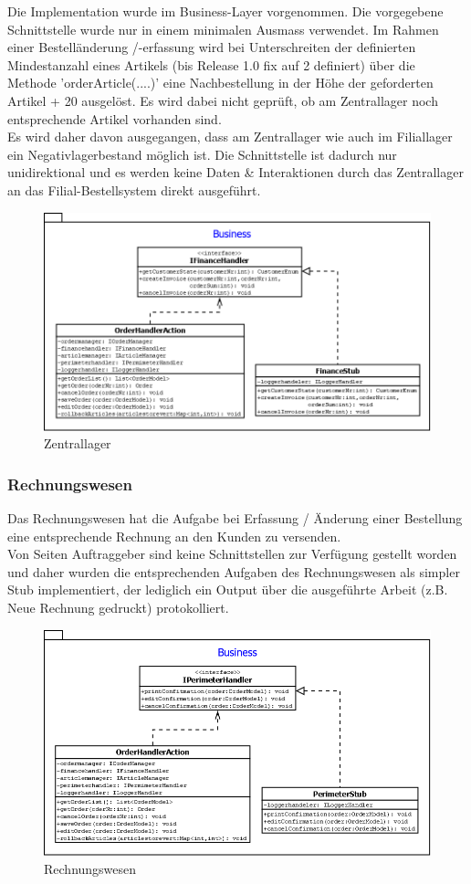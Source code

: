 Die Implementation wurde im Business-Layer vorgenommen. Die vorgegebene Schnittstelle wurde nur in einem minimalen Ausmass verwendet. Im Rahmen einer Bestelländerung /-erfassung wird bei Unterschreiten der definierten Mindestanzahl eines Artikels (bis Release 1.0 fix auf 2 definiert) über die Methode 'orderArticle(....)' eine Nachbestellung in der Höhe der geforderten Artikel + 20 ausgelöst. Es wird dabei nicht geprüft, ob am Zentrallager noch entsprechende Artikel vorhanden sind. \\Es wird daher davon ausgegangen, dass am Zentrallager wie auch im Filiallager ein Negativlagerbestand möglich ist. Die Schnittstelle ist dadurch nur unidirektional und es werden keine Daten \& Interaktionen durch das Zentrallager an das Filial-Bestellsystem direkt ausgeführt.  \\
\begin{figure}[H]
\centering
	\includegraphics[width=0.8\linewidth]{Images/Zentrallager}
	\caption{Zentrallager}
	\label{fig:zentrallager}
\end{figure}



\subsubsection{Rechnungswesen}
Das Rechnungswesen hat die Aufgabe bei Erfassung / Änderung einer Bestellung eine entsprechende Rechnung an den Kunden zu versenden.\\
Von Seiten Auftraggeber sind keine Schnittstellen zur Verfügung gestellt worden und daher wurden die entsprechenden Aufgaben des Rechnungswesen als simpler Stub implementiert, der lediglich ein Output über die ausgeführte Arbeit (z.B. Neue Rechnung gedruckt) protokolliert. \\
\begin{figure}[H]
\centering
	\includegraphics[width=0.8\linewidth]{Images/Rechnungswesen}
	\caption{Rechnungswesen}
	\label{fig:rechnungswesen}
\end{figure}
\clearpage

